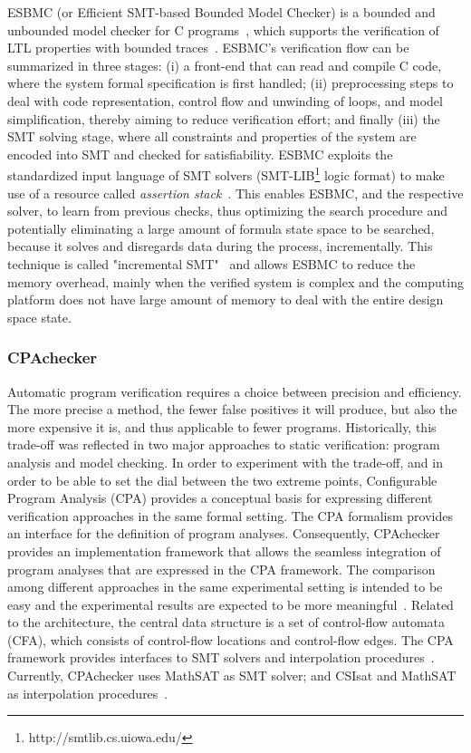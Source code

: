 \documentclass[review]{elsarticle}
\begin{document}
ESBMC (or Efficient SMT-based Bounded Model Checker) is a bounded and unbounded model checker for C programs~\cite{esbmc2018}, which supports the verification of LTL properties with bounded traces~\cite{DBLP:journals/sosym/MorseCN015}. ESBMC's verification flow can be summarized in three stages: (i) a front-end that can read and compile C code, where the system formal specification is first handled; (ii) preprocessing steps to deal with code representation, control flow and unwinding of loops, and model simplification, thereby aiming to reduce verification effort; and finally (iii) the SMT solving stage, where all constraints and properties of the system are encoded into SMT and checked for satisfiability. ESBMC exploits the standardized input language of SMT solvers (SMT-LIB\footnote{http://smtlib.cs.uiowa.edu/} logic format) to make use of a resource called \textit{assertion stack}~\cite{Morse2015}. This enables ESBMC, and the respective solver, to learn from previous checks, thus optimizing the search procedure and potentially eliminating a large amount of formula state space to be searched, because it solves and disregards data during the process, incrementally. This technique is called "incremental SMT"~\cite{DBLP:journals/fac/SchrammelKBMTB17} and allows ESBMC to reduce the memory overhead, mainly when the verified system is complex and the computing platform does not have large amount of memory to deal with the entire design space state.

\subsubsection{CPAchecker}

Automatic program verification requires a choice between precision and efficiency. 
The more precise a method, the fewer false positives it will produce, but also the 
more expensive it is, and thus applicable to fewer programs. 
Historically, this trade-off was reflected in two major approaches to static verification: 
program analysis and model checking. In order to experiment with the trade-off, 
and in order to be able to set the dial between the two extreme points, 
Configurable Program Analysis (CPA) provides a conceptual basis for expressing 
different verification approaches in the same formal setting. The CPA formalism 
provides an interface for the definition of program analyses. Consequently, CPAchecker 
provides an implementation framework that allows the seamless integration of program 
analyses that are expressed in the CPA framework. The comparison among different 
approaches in the same experimental setting is intended to be easy and the experimental 
results are expected to be more meaningful~\citep{Beyer2011}. Related to the architecture, 
the central data structure is a set of control-flow automata (CFA), which consists of control-flow 
locations and control-flow edges. The CPA framework provides interfaces to SMT solvers and 
interpolation procedures~\citep{Beyer2011}. Currently, CPAchecker uses MathSAT as SMT solver; 
and CSIsat and MathSAT as interpolation procedures~\cite{Beyer2011}. 
\end{document}
